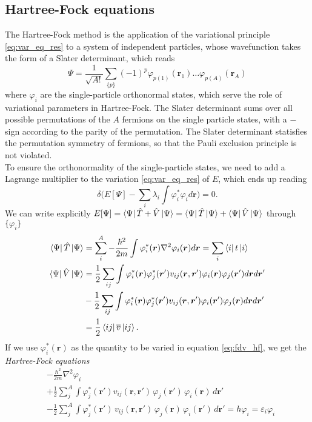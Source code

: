 \subsection{Hartree-Fock equations}
The Hartree-Fock method is the application of the variational principle \eqref{eq:var_eq_res} to a system of independent particles, whose wavefunction takes the form of a Slater determinant, which reads
\begin{equation}
    \label{eq:slater_formula}
    \Psi = \frac{1}{\sqrt {A!}} \sum_{\{p\}} (-1)^{p}  \varphi_{p(1)}(\bm r_1)\ldots \varphi_{p(A)}(\bm r_A)
\end{equation}
where $\varphi_i$ are the single-particle orthonormal states, which serve the role of variational parameters in Hartree-Fock.
The Slater determinant sums over all possible permutations of the $A$ fermions on the single particle states, with a $-$ sign according to the parity of the permutation.
The Slater determinant statisfies the permutation symmetry of fermions, so that the Pauli exclusion principle is not violated.
\\To ensure the orthonormality of the single-particle states, we need to add a Lagrange multiplier to the variation \eqref{eq:var_eq_res} of $E$, which ends up reading
\begin{equation}
    \label{eq:fdv_hf}
\delta \bigg(E[\Psi] - \sum_i\lambda_i \int \varphi_i^*\varphi_i d\bm r \bigg) = 0.
\end{equation}
We can write explicitly $E[\Psi] = \bra{\Psi} \hat T + \hat V\ket \Psi = \bra{\Psi}\hat T \ket{\Psi}+ \bra{\Psi}\hat V \ket{\Psi}$ through $\{\varphi_i\}$
\begin{align}
    \label{eq:exp_T_V}
    \bra\Psi\hat T\ket \Psi &= \sum_i^A -\frac{\hbar^2}{2m}\int \varphi_i^*(\bm r) \nabla^2 \varphi_i(\bm r) d\bm r=\sum_i \bra{i}t\ket{i}\\
    \bra\Psi\hat V\ket \Psi &= \frac 1 2 \sum_{ij}\int\varphi_i^*(\bm r) \varphi_j^*(\bm r') v_{ij}(\bm r, \bm r')\varphi_i(\bm r)\varphi_j(\bm r') d\bm r d\bm r'\\
    &- \frac 1 2 \sum_{ij}\int \varphi_i^*(\bm r) \varphi_j^*(\bm r') v_{ij}(\bm r, \bm r')\varphi_i(\bm r')\varphi_j(\bm r) d\bm r d\bm r' \\&= \frac 1 2 \bra{ij}\overline v \ket{ij}.
\end{align}
If we use $\varphi_i^*(\bm r)$ as the quantity to be varied in equation \eqref{eq:fdv_hf}, we get the \textit{Hartree-Fock equations}
\begin{align}
    \label{eq:hf_equations}
    &-\frac{\hbar^2}{2m} \nabla^2 \varphi_i\\
    &+ \frac 1 2 \sum_{j}^A \int \varphi_j^* (\mathbf r') 
        v_{ij}(\mathbf r, \mathbf r')\, 
        \varphi_j (\mathbf r')\, 
        \varphi_i (\mathbf r)\, d\mathbf r'\label{eq:hartree} \\
    &- \frac 1 2 \sum_{j}^A \int \varphi_j^* (\mathbf r')\, 
        v_{ij}(\mathbf r, \mathbf r')\,
        \varphi_j (\mathbf r)\,
        \varphi_i (\mathbf r')\, d\mathbf r'\label{eq:fock}
        = h \varphi_i = \varepsilon_i \varphi_i
\end{align}
